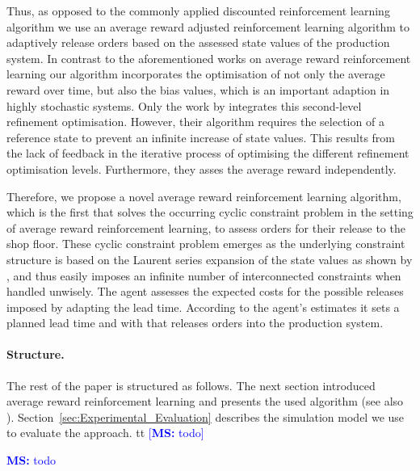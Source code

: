 \documentclass[envcountsame]{llncs}
\newcommand\MS[2][r]{\ifx t#1 \textcolor{blue}{[\textbf{MS:} #2]}
  \else \begin{center}\textcolor{blue}{\textbf{MS:} #2} \end{center} \fi}
\begin{document}
Thus, as opposed to the commonly applied discounted reinforcement learning algorithm we use an
average reward adjusted reinforcement learning algorithm to adaptively release orders based on the
assessed state values of the production system. In contrast to the aforementioned works on average
reward reinforcement learning our algorithm incorporates the optimisation of not only the average
reward over time, but also the bias values, which is an important adaption in highly stochastic
systems. Only the work by
\cite{Mahadevan96_AnAveragerewardReinforcementLearningAlgorithmForComputingBiasoptimalPolicies}
integrates this second-level refinement optimisation. However, their algorithm requires the
selection of a reference state to prevent an infinite increase of state values. This results from
the lack of feedback in the iterative process of optimising the different refinement optimisation
levels. Furthermore, they asses the average reward independently.

Therefore, we propose a novel average reward reinforcement learning algorithm, which is the first
that solves the occurring cyclic constraint problem in the setting of average reward reinforcement
learning, to assess orders for their release to the shop floor. These cyclic constraint problem
emerges as the underlying constraint structure is based on the Laurent series expansion of the state
values as shown by \cite{MillerVeinott1969}, and thus easily imposes an infinite number of
interconnected constraints when handled unwisely.
%
The agent assesses the expected costs for the possible releases imposed by adapting the lead time.
According to the agent's estimates it sets a planned lead time and with that releases orders into
the production system.
%

\paragraph{Structure.} The rest of the paper is structured as follows. The next section introduced
average reward reinforcement learning and presents the used algorithm (see also
\citealt{schneckenreither2020average}). Section~\ref{sec:Experimental_Evaluation} describes the
simulation model we use to evaluate the approach. \MS[t]{todo}
\end{document}
